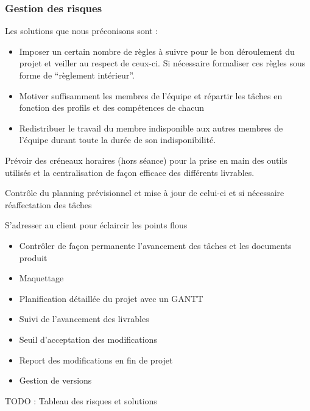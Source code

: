 \subsubsection{Gestion des risques}

\setcounter{solutions}{0}

\newcommand{\solution}[1]{
    \addtocounter{solutions}{1}
    \item[S\thesolutions]{\indent#1}
}

Les solutions que nous préconisons sont :
\begin{description}
    \solution{
        \begin{itemize}
            \item Imposer un certain nombre de règles à suivre pour le bon déroulement du projet et veiller au respect de ceux-ci. Si nécessaire formaliser ces règles sous forme de “règlement intérieur”.
            \item Motiver suffisamment les membres de l’équipe  et répartir les tâches en fonction des profils et des compétences de chacun
            \item Redistribuer le travail du membre indisponible aux autres membres de l’équipe durant toute la durée de son indisponibilité.
        \end{itemize}}
    \solution{
        Prévoir des créneaux horaires (hors séance) pour la prise en main des outils utilisés  et la centralisation de façon efficace des différents livrables.}

    \solution{
        Contrôle du planning prévisionnel et mise à jour de celui-ci et si nécessaire réaffectation des tâches}
    \solution{
        S’adresser au client pour éclaircir les points flous}
    \solution{
        \begin{itemize}
            \item Contrôler de façon permanente l’avancement des tâches et les documents produit
            \item Maquettage
        \end{itemize}}
    \solution{
        \begin{itemize}
            \item Planification détaillée du projet avec un GANTT
            \item Suivi de l’avancement des livrables
        \end{itemize}}
    \solution{
        \begin{itemize}
            \item Seuil d’acceptation des modifications
            \item Report des modifications en fin de projet
            \item Gestion de versions
        \end{itemize}}
\end{description}        
TODO : Tableau des risques et solutions



